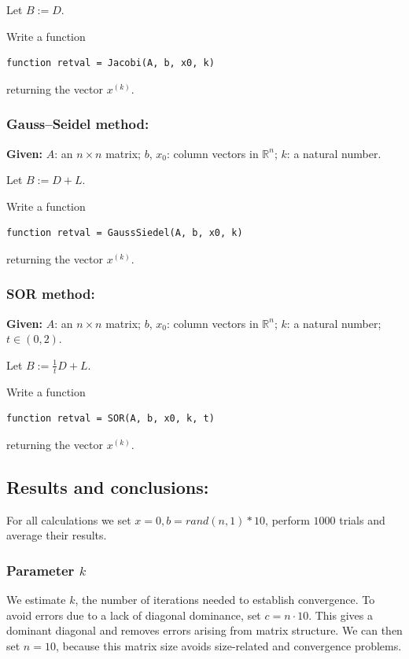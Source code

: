 \documentclass[a4paper, 11pt]{article}
\begin{document}
Let \( B := D \).

Write a function
\begin{center}
\begin{verbatim}
function retval = Jacobi(A, b, x0, k)
\end{verbatim}
\end{center}
returning the vector \( x^{(k)} \).

\subsubsection{Gauss--Seidel method:}

\noindent \textbf{Given:} \( A \): an \( n \times n \) matrix; \( b \), \( x_0 \): column vectors in \( \mathbb{R}^n \); \( k \): a natural number.

Let \( B := D + L \).

Write a function
\begin{center}
\begin{verbatim}
function retval = GaussSiedel(A, b, x0, k)
\end{verbatim}
\end{center}
returning the vector \( x^{(k)} \).

\subsubsection{SOR method:}

\noindent \textbf{Given:} \( A \): an \( n \times n \) matrix; \( b \), \( x_0 \): column vectors in \( \mathbb{R}^n \); \( k \): a natural number; \( t \in (0, 2) \).

Let \( B := \frac{1}{t} D + L \).

Write a function
\begin{center}
\begin{verbatim}
function retval = SOR(A, b, x0, k, t)
\end{verbatim}
\end{center}
returning the vector \( x^{(k)} \).


\subsection{Results and conclusions:} 
For all calculations we set $x=0, b=rand(n,1) *10$, perform $1000$ trials and average their results.\\
\subsubsection{Parameter $k$}
We estimate \( k \), the number of iterations needed to establish convergence. To avoid errors due to a lack of diagonal dominance, set \( c = n \cdot 10 \). This gives a dominant diagonal and removes errors arising from matrix structure. We can then set \( n = 10 \), because this matrix size avoids size-related and convergence problems.
\end{document}
